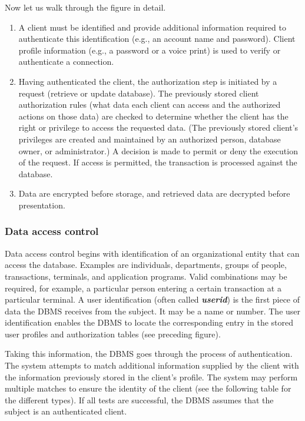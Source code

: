 \documentclass[
]{article}
\begin{document}
Now let us walk through the figure in detail.

\begin{enumerate}
\def\labelenumi{\arabic{enumi}.}
\item
  A client must be identified and provide additional information
  required to authenticate this identification (e.g., an account name
  and password). Client profile information (e.g., a password or a
  voice print) is used to verify or authenticate a connection.
\item
  Having authenticated the client, the authorization step is initiated
  by a request (retrieve or update database). The previously stored
  client authorization rules (what data each client can access and the
  authorized actions on those data) are checked to determine whether
  the client has the right or privilege to access the requested data.
  (The previously stored client's privileges are created and
  maintained by an authorized person, database owner, or
  administrator.) A decision is made to permit or deny the execution
  of the request. If access is permitted, the transaction is processed
  against the database.
\item
  Data are encrypted before storage, and retrieved data are decrypted
  before presentation.
\end{enumerate}

\hypertarget{data-access-control}{%
\subsubsection*{Data access control}\label{data-access-control}}

Data access control begins with identification of an organizational
entity that can access the database. Examples are individuals,
departments, groups of people, transactions, terminals, and application
programs. Valid combinations may be required, for example, a particular
person entering a certain transaction at a particular terminal. A user
identification (often called \textbf{\emph{userid}}) is the first piece of data
the DBMS receives from the subject. It may be a name or number. The user
identification enables the DBMS to locate the corresponding entry in the
stored user profiles and authorization tables (see preceding figure).

Taking this information, the DBMS goes through the process of
authentication. The system attempts to match additional information
supplied by the client with the information previously stored in the
client's profile. The system may perform multiple matches to ensure the
identity of the client (see the following table for the different
types). If all tests are successful, the DBMS assumes that the subject
is an authenticated client.
\end{document}
